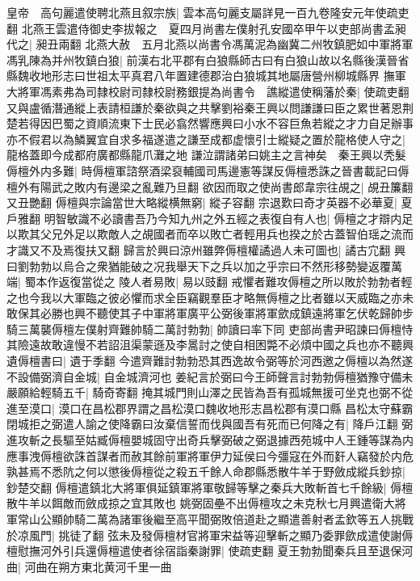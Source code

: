 皇帝　高句麗遣使聘北燕且叙宗族|{
	雲本高句麗支屬詳見一百九卷隆安元年使疏吏翻}
北燕王雲遣侍御史李拔報之　夏四月尚書左僕射孔安國卒甲午以吏部尚書孟昶代之|{
	昶丑兩翻}
北燕大赦　五月北燕以尚書令馮萬泥為幽冀二州牧鎮肥如中軍將軍馮乳陳為并州牧鎮白狼|{
	前漢右北平郡有白狼縣師古曰有白狼山故以名縣後漢晉省縣魏收地形志曰世祖太平真君八年置建德郡治白狼城其地屬唐營州柳城縣界}
撫軍大將軍馮素弗為司隸校尉司隸校尉務銀提為尚書令　譙縱遣使稱藩於秦|{
	使疏吏翻}
又與盧循潛通縱上表請桓謙於秦欲與之共擊劉裕秦王興以問謙謙曰臣之累世著恩荆楚若得因巴蜀之資順流東下士民必翕然響應興曰小水不容巨魚若縱之才力自足辦事亦不假君以為鱗翼宜自求多福遂遣之謙至成都虚懷引士縱疑之置於龍格使人守之|{
	龍格蓋即今成都府廣都縣龍爪灘之地}
謙泣謂諸弟曰姚主之言神矣　秦王興以秃髮傉檀外内多難|{
	時傉檀軍諮祭酒梁裒輔國司馬邊憲等謀反傉檀悉誅之晉書載記曰傉檀外有陽武之敗内有邊梁之亂難乃旦翻}
欲因而取之使尚書郎韋宗往覘之|{
	覘丑簾翻又丑艷翻}
傉檀與宗論當世大略縱横無窮|{
	縱子容翻}
宗退歎曰奇才英器不必華夏|{
	夏戶雅翻}
明智敏識不必讀書吾乃今知九州之外五經之表復自有人也|{
	傉檀之才辯内足以欺其父兄外足以欺敵人之覘國者而卒以敗亡者輕用兵也揆之於古蓋智伯瑶之流而才識又不及焉復扶又翻}
歸言於興曰涼州雖弊傉檀權譎過人未可圖也|{
	譎古宂翻}
興曰劉勃勃以烏合之衆猶能破之况我舉天下之兵以加之乎宗曰不然形移勢變返覆萬端|{
	蜀本作返復當從之}
陵人者易敗|{
	易以豉翻}
戒懼者難攻傉檀之所以敗於勃勃者輕之也今我以大軍臨之彼必懼而求全臣竊觀羣臣才略無傉檀之比者雖以天威臨之亦未敢保其必勝也興不聽使其子中軍將軍廣平公弼後軍將軍歛成鎮遠將軍乞伏乾歸帥步騎三萬襲傉檀左僕射齊難帥騎二萬討勃勃|{
	帥讀曰率下同}
吏部尚書尹昭諫曰傉檀恃其險遠故敢違慢不若詔沮渠蒙遜及李暠討之使自相困斃不必煩中國之兵也亦不聽興遺傉檀書曰|{
	遺于季翻}
今遣齊難討勃勃恐其西逸故令弼等於河西邀之傉檀以為然遂不設備弼濟自金城|{
	自金城濟河也}
姜紀言於弼曰今王師聲言討勃勃傉檀猶豫守備未嚴願給輕騎五千|{
	騎奇寄翻}
掩其城門則山澤之民皆為吾有孤城無援可坐克也弼不從進至漠口|{
	漠口在昌松郡界謂之昌松漠口魏收地形志昌松郡有漠口縣}
昌松太守蘇霸閉城拒之弼遣人諭之使降霸曰汝棄信誓而伐與國吾有死而已何降之有|{
	降戶江翻}
弼進攻斬之長驅至姑臧傉檀嬰城固守出奇兵擊弼破之弼退據西苑城中人王鍾等謀為内應事洩傉檀欲誅首謀者而赦其餘前軍將軍伊力延侯曰今彊寇在外而姧人竊發於内危孰甚焉不悉阬之何以懲後傉檀從之殺五千餘人命郡縣悉散牛羊于野斂成縱兵鈔掠|{
	鈔楚交翻}
傉檀遣鎮北大將軍俱延鎮軍將軍敬歸等擊之秦兵大敗斬首七千餘級|{
	傉檀散牛羊以餌敵而斂成掠之宜其敗也}
姚弼固壘不出傉檀攻之未克秋七月興遣衛大將軍常山公顯帥騎二萬為諸軍後繼至高平聞弼敗倍道赴之顯遣善射者孟欽等五人挑戰於凉風門|{
	挑徒了翻}
弦未及發傉檀材官將軍宋益等迎擊斬之顯乃委罪歛成遣使謝傉檀慰撫河外引兵還傉檀遣使者徐宿詣秦謝罪|{
	使疏吏翻}
夏王勃勃聞秦兵且至退保河曲|{
	河曲在朔方東北黄河千里一曲}
